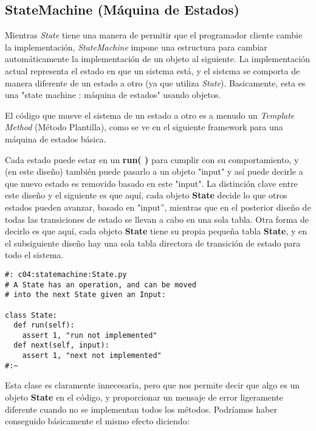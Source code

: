 \newpage

\subsection*{StateMachine (Máquina de Estados)}
\label{subsec:sm}


Mientras \textit{State} tiene una manera de permitir que el programador cliente cambie la implementación, \textit{StateMachine} impone una estructura para cambiar automáticamente la implementación de un objeto al siguiente. La implementación actual representa el estado en que un sistema está, y el sistema se comporta de manera diferente de un estado a otro (ya que utiliza \textit{State}). Basicamente, esta es una "state machine : máquina de estados" usando objetos.     \newline

El código que mueve el sistema de un estado a otro es a menudo un \textit{Template Method} (Método Plantilla), como se ve en el siguiente framework para una máquina de estados básica.    \newline

Cada estado puede estar en un \textbf{run( )} para cumplir con su comportamiento, y (en este diseño) también puede pasarlo a un objeto "input" y así puede decirle a que nuevo estado es removido basado en este "input".
La distinción clave entre este diseño y el siguiente es que aquí, cada objeto \textbf{State} decide lo que otros estados pueden avanzar, basado en "input”, mientras que en el posterior diseño de todas las transiciones de estado se llevan a cabo en una sola tabla. Otra forma de decirlo es que aquí, cada objeto \textbf{State} tiene su propia pequeña tabla \textbf{State}, y en el subsiguiente diseño hay una sola tabla directora de transición de estado para todo el sistema.   \newline

 \begin{lstlisting}
#: c04:statemachine:State.py 
# A State has an operation, and can be moved 
# into the next State given an Input: 

class State: 
  def run(self):  
    assert 1, "run not implemented" 
  def next(self, input): 
    assert 1, "next not implemented" 
#:~ 
 \end{lstlisting}
 
 Esta clase es claramente innecesaria, pero que nos permite decir que algo es un objeto \textbf{State} en el código, y proporcionar un mensaje de error ligeramente diferente cuando no se implementan todos los métodos. Podríamos haber conseguido básicamente el mismo efecto diciendo:      \newline
 
